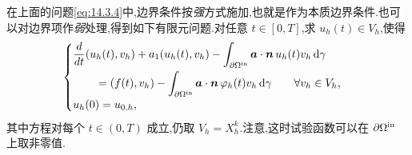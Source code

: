 在上面的问题\eqref{eq:14.3.4}中,边界条件按\emph{强}方式施加,也就是作为本质边界条件.也可以对边界项作\emph{弱}处理,得到如下有限元问题.对任意 \(t\in[0,T]\),求 \(u_h(t)\in V_h\),使得
\begin{equation}\label{eq:14.3.11}
  \begin{cases}
    \begin{aligned}
      &\dfrac{d}{dt}(u_h(t),v_h)+a_1(u_h(t),v_h)
          -\int_{\partial\Omega^{\rm in}}\boldsymbol{a}\cdot\boldsymbol{n}\,u_h(t)v_h\,\mathrm d\gamma\\
      &\qquad=(f(t),v_h)-\int_{\partial\Omega^{\rm in}}
          \boldsymbol{a}\cdot\boldsymbol{n}\,\varphi_h(t)v_h\,\mathrm d\gamma
           \qquad\forall v_h\in V_h,
    \end{aligned}\\[2pt]
    u_h(0)=u_{0,h},
  \end{cases}
\end{equation}
其中方程对每个 \(t\in(0,T)\) 成立,仍取 \(V_h=X_h^k\).注意,这时试验函数可以在 \(\partial\Omega^{\rm in}\) 上取非零值.


